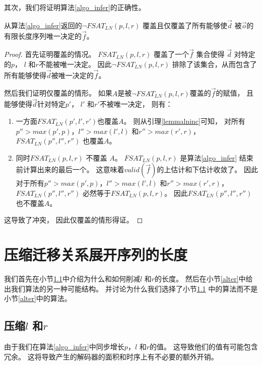 其次，我们将证明算法\ref{algo_infer}的正确性。

\begin{theorem}
从算法\ref{algo_infer}返回的$\neg FSAT_{LN}(p,l,r)$  覆盖且仅覆盖了所有能够使$\vec{d}$
被$\vec{o}$的有限长度序列唯一决定的$\vec{f}$。
\end{theorem}
\begin{proof}
首先证明覆盖的情况。
$FSAT_{LN}(p,l,r)$ 覆盖了一个$\vec{f}$ 集合使得
$\vec{d}$ 对特定的$p$， $l$ 和$r$不能被唯一决定。
因此$\neg FSAT_{LN}(p,l,r)$ 排除了该集合，从而包含了所有能够使得$\vec{d}$被唯一决定的$\vec{f}$。

然后我们证明仅覆盖的情形。
如果$A$是被$\neg FSAT_{LN}(p,l,r)$覆盖的$\vec{f}$的赋值，
且能够使得$\vec{d}$针对特定$p'$， $l'$ 和$r'$不被唯一决定，
则有：

\begin{enumerate}
 \item 一方面$FSAT_{LN}(p',l',r')$也覆盖$A$。
 则从引理\ref{lemmalninc}可知，
 对所有$p''>max(p',p)$，$l''>max(l',l)$ 和$r''>max(r',r)$，
 $FSAT_{LN}(p'',l'',r'')$ 也覆盖$A$。

 \item 同时$FSAT_{LN}(p,l,r)$ 不覆盖 $A$。
 $FSAT_{LN}(p,l,r)$ 是算法\ref{algo_infer} 结束前计算出来的最后一个。
 这意味着$valid(\vec{f})$的上估计和下估计收敛了。
 因此对于所有$p''>max(p',p)$，$l''>max(l',l)$ 和$r''>max(r',r)$，
 $FSAT_{LN}(p'',l'',r'')$ 必然等于$FSAT_{LN}(p,l,r)$。
 因此$FSAT_{LN}(p'',l'',r'')$ 也不覆盖$A$。
\end{enumerate}

这导致了冲突，
因此仅覆盖的情形得证。
\end{proof}


\section{压缩迁移关系展开序列的长度}\label{sec_min}
我们首先在小节\ref{reduceing_chap3}中介绍为什么和如何削减$l$ 和$r$的长度。
然后在小节\ref{alter}中给出我们算法的另一种可能结构。
并讨论为什么我们选择了小节\ref{reduceing_chap3} 中的算法而不是小节\ref{alter}中的算法。

\subsection{压缩$l$ 和$r$}\label{reduceing_chap3}
由于我们在算法\ref{algo_infer}中同步增长$p$，$l$ 和$r$的值。
这导致他们的值有可能包含冗余。
这将导致产生的解码器的面积和时序上有不必要的额外开销。

